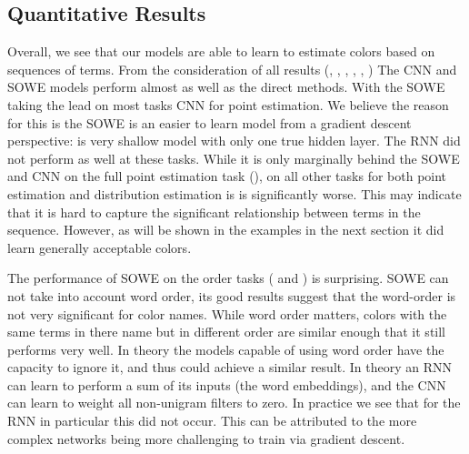 \documentclass[11pt,a4paper]{article}
\begin{document}
	\clearpage


\subsection{Quantitative Results}\label{sec:quantitative-results}

Overall, we see that our models are able to learn to estimate colors based on sequences of terms.
From the consideration of all results (, , , , , )
The CNN and SOWE models perform almost as well as the direct methods.
With the SOWE taking the lead on most tasks CNN for point estimation.
We believe the reason for this is the SOWE is an easier to learn model from a gradient descent perspective: is very shallow model with only one true hidden layer.
The RNN did not perform as well at these tasks.
While it is only marginally behind the SOWE and CNN on the full point estimation task (), on all other tasks for both point estimation and distribution estimation is is significantly worse.
This may indicate that it is  hard to capture the significant relationship between terms in the sequence.
However, as will be shown in the examples in the next section it did learn generally acceptable colors.


The performance of SOWE on the order tasks ( and ) is surprising.
SOWE can not take into account word order, its good results suggest that the word-order is not very significant for color names.
While word order matters, colors with the same terms in there name but in different order are similar enough that it still performs very well.
In theory the models capable of using word order have the capacity to ignore it, and thus could achieve a similar result.
In theory an RNN can learn to perform a sum of its inputs (the word embeddings),
and the CNN can learn to weight all non-unigram filters to zero.
In practice we see that for the RNN in particular this did not occur.
This can be attributed to the more complex networks being more challenging to train via gradient descent.
\end{document}
